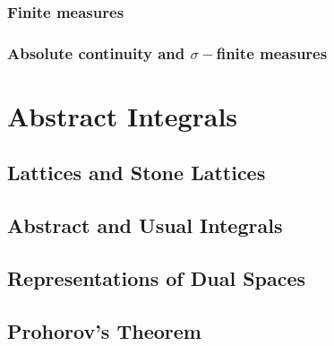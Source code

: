 \documentclass{report}
\begin{document}
\subsection{Finite measures}


\subsection{Absolute continuity and $\sigma-$finite measures}


\chapter{Abstract Integrals}
\section{Lattices and Stone Lattices}

\section{Abstract and Usual Integrals}

\section{Representations of Dual Spaces}

\section{Prohorov's Theorem}
\end{document}
